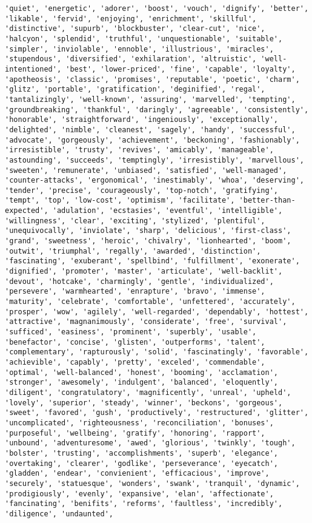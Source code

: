 \documentclass[11pt]{article}
\begin{document}
\begin{Verbatim}[commandchars=\\\{\}]
'quiet', 'energetic', 'adorer', 'boost', 'vouch', 'dignify', 'better', 'likable', 'fervid', 'enjoying', 'enrichment', 'skillful', 'distinctive', 'supurb', 'blockbuster', 'clear-cut', 'nice', 'halcyon', 'splendid', 'truthful', 'unquestionable', 'suitable', 'simpler', 'inviolable', 'ennoble', 'illustrious', 'miracles', 'stupendous', 'diversified', 'exhilaration', 'altruistic', 'well-intentioned', 'best', 'lower-priced', 'fine', 'capable', 'loyalty', 'apotheosis', 'classic', 'promises', 'reputable', 'poetic', 'charm', 'glitz', 'portable', 'gratification', 'deginified', 'regal', 'tantalizingly', 'well-known', 'assuring', 'marvelled', 'tempting', 'groundbreaking', 'thankful', 'daringly', 'agreeable', 'consistently', 'honorable', 'straightforward', 'ingeniously', 'exceptionally', 'delighted', 'nimble', 'cleanest', 'sagely', 'handy', 'successful', 'advocate', 'gorgeously', 'achievement', 'beckoning', 'fashionably', 'irresistible', 'trusty', 'revives', 'amicably', 'manageable', 'astounding', 'succeeds', 'temptingly', 'irresistibly', 'marvellous', 'sweeten', 'remunerate', 'unbiased', 'satisfied', 'well-managed', 'counter-attacks', 'ergonomical', 'inestimably', 'whoa', 'deserving', 'tender', 'precise', 'courageously', 'top-notch', 'gratifying', 'tempt', 'top', 'low-cost', 'optimism', 'facilitate', 'better-than-expected', 'adulation', 'ecstasies', 'eventful', 'intelligible', 'willingness', 'clear', 'exciting', 'stylized', 'plentiful', 'unequivocally', 'inviolate', 'sharp', 'delicious', 'first-class', 'grand', 'sweetness', 'heroic', 'chivalry', 'lionhearted', 'boom', 'outwit', 'triumphal', 'regally', 'awarded', 'distinction', 'fascinating', 'exuberant', 'spellbind', 'fulfillment', 'exonerate', 'dignified', 'promoter', 'master', 'articulate', 'well-backlit', 'devout', 'hotcake', 'charmingly', 'gentle', 'individualized', 'persevere', 'warmhearted', 'enrapture', 'bravo', 'immense', 'maturity', 'celebrate', 'comfortable', 'unfettered', 'accurately', 'prosper', 'wow', 'agilely', 'well-regarded', 'dependably', 'hottest', 'attractive', 'magnanimously', 'considerate', 'free', 'survival', 'sufficed', 'easiness', 'prominent', 'superbly', 'usable', 'benefactor', 'concise', 'glisten', 'outperforms', 'talent', 'complementary', 'rapturously', 'solid', 'fascinatingly', 'favorable', 'achievible', 'capably', 'pretty', 'exceled', 'commendable', 'optimal', 'well-balanced', 'honest', 'booming', 'acclamation', 'stronger', 'awesomely', 'indulgent', 'balanced', 'eloquently', 'diligent', 'congratulatory', 'magnificently', 'unreal', 'upheld', 'lovely', 'superior', 'steady', 'winner', 'beckons', 'gorgeous', 'sweet', 'favored', 'gush', 'productively', 'restructured', 'glitter', 'uncomplicated', 'righteousness', 'reconciliation', 'bonuses', 'purposeful', 'wellbeing', 'gratify', 'honoring', 'rapport', 'unbound', 'adventuresome', 'awed', 'glorious', 'twinkly', 'tough', 'bolster', 'trusting', 'accomplishments', 'superb', 'elegance', 'overtaking', 'clearer', 'godlike', 'perseverance', 'eyecatch', 'gladden', 'endear', 'convienient', 'efficacious', 'improve', 'securely', 'statuesque', 'wonders', 'swank', 'tranquil', 'dynamic', 'prodigiously', 'evenly', 'expansive', 'elan', 'affectionate', 'fancinating', 'benifits', 'reforms', 'faultless', 'incredibly', 'diligence', 'undaunted', 
\end{Verbatim}
\end{document}

